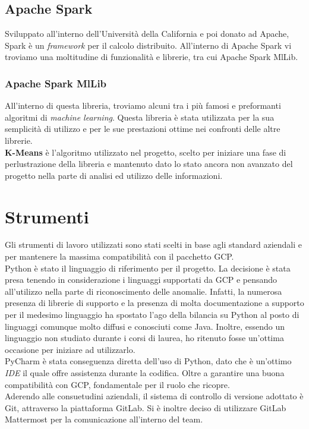 \subsection{Apache Spark}
Sviluppato all'interno dell'Università della California e poi donato ad Apache, Spark è un \emph{framework} per il calcolo distribuito. 
All'interno di Apache Spark vi troviamo una moltitudine di funzionalità e librerie, tra cui Apache Spark MlLib.
\subsubsection{Apache Spark MlLib}
All'interno di questa libreria, troviamo alcuni tra i più famosi e preformanti algoritmi di \emph{machine learning}. Questa libreria è stata utilizzata per la sua semplicità di utilizzo e per le sue prestazioni ottime nei confronti delle altre librerie.
\\
\textbf{K-Means} \cite{k-means} è  l'algoritmo utilizzato nel progetto, scelto per iniziare una fase di perlustrazione della libreria e mantenuto dato lo stato ancora non avanzato del progetto nella parte di analisi ed utilizzo delle informazioni.
\section{Strumenti}
Gli strumenti di lavoro utilizzati sono stati scelti in base agli standard aziendali e per mantenere la massima compatibilità con il pacchetto GCP.
\\
Python è stato il linguaggio di riferimento per il progetto. La decisione è stata presa tenendo in considerazione i linguaggi supportati da GCP e pensando all'utilizzo nella parte di riconoscimento delle anomalie. Infatti, la numerosa presenza di librerie di supporto e la presenza di molta documentazione a supporto per il medesimo linguaggio ha spostato l'ago della bilancia su Python al posto di linguaggi comunque molto diffusi e conosciuti come Java. Inoltre, essendo un linguaggio non studiato durante i corsi di laurea, ho ritenuto fosse un'ottima occasione per iniziare ad utilizzarlo.
\\
PyCharm è stata conseguenza diretta dell'uso di Python, dato che è un'ottimo \emph{IDE} il quale offre assistenza durante la codifica. Oltre a garantire una buona compatibilità con GCP, fondamentale per il ruolo che ricopre.
\\
Aderendo alle consuetudini aziendali, il sistema di controllo di versione adottato è Git, attraverso la piattaforma GitLab. Si è inoltre deciso di utilizzare GitLab Mattermost per la comunicazione all'interno del team.

